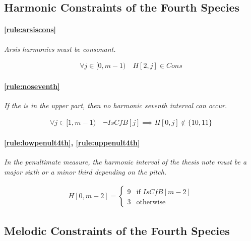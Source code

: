 \subsection{Harmonic Constraints of the Fourth Species}
\paragraph{\ref{rule:arsiscons}} \textit{Arsis harmonies must be consonant.}

\begin{equation}
    \begin{gathered}
        \forall j \in [0, m-1) \quad
        H[2, j] \in Cons
    \end{gathered}
    \label{eq:arsiscons}
\end{equation}

\paragraph{\ref{rule:noseventh}} \textit{If the \cf is in the upper part, then no harmonic seventh interval can occur.}

\begin{equation}
    \begin{gathered}
        \forall j \in [1, m-1) \quad
        \lnot IsCfB[j] \implies H[0, j] \notin \{10, 11\}
    \end{gathered}
\end{equation}

\paragraph{\ref{rule:lowpenult4th}, \ref{rule:uppenult4th}} \textit{In the penultimate measure, the harmonic interval of the thesis note must be a major sixth or a minor third depending on the \cf pitch.}

\begin{equation}
    \begin{gathered}
        H[0, m-2] = \begin{cases}
            9 & \text{if } IsCfB[m-2]\\
            3 & \text{otherwise}
        \end{cases}
    \end{gathered}
\end{equation}

\subsection{Melodic Constraints of the Fourth Species}
